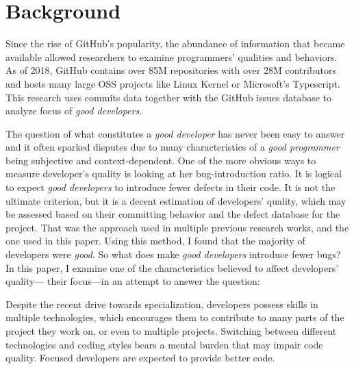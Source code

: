 
\chapter{Background}\label{chapter:background}

Since the rise of GitHub’s popularity, the abundance of information that became available allowed researchers to examine programmers’ qualities and behaviors. As of 2018, GitHub contains over 85M repositories with over 28M contributors~\parencite{github} and hosts many large OSS projects like Linux Kernel or Microsoft’s Typescript. This research uses commits data together with the GitHub issues database to analyze focus of \textit{good developers}. \par

The question of what constitutes a \textit{good developer} has never been easy to answer and it often sparked disputes due to many characteristics of a \textit{good programmer} being subjective and context-dependent. One of the more obvious ways to measure developer’s quality is looking at her bug-introduction ratio. It is logical to expect \textit{good developers} to introduce fewer defects in their code. It is not the ultimate criterion, but it is a decent estimation of developers’ quality, which may be assessed based on their committing behavior and the defect database for the project. That was the approach used in multiple previous research works\parencite{Izquierdo-Cortazar,Sliwerski,tsunoda,posnett}, and the one used in this paper. Using this method, I found that the majority of developers were \textit{good}. So what does make \textit{good developers} introduce fewer bugs? In this paper, I examine one of the characteristics believed to affect developers’ quality— their focus—in an attempt to answer the question: \par

\vspace{5mm}
\noindent{}
\vspace{2mm}

Despite the recent drive towards specialization, developers possess skills in multiple technologies, which encourages them to contribute to many parts of the project they work on, or even to multiple projects. Switching between different technologies and coding styles bears a mental burden that may impair code quality. Focused developers are expected to provide better code\parencite{posnett}. \par

